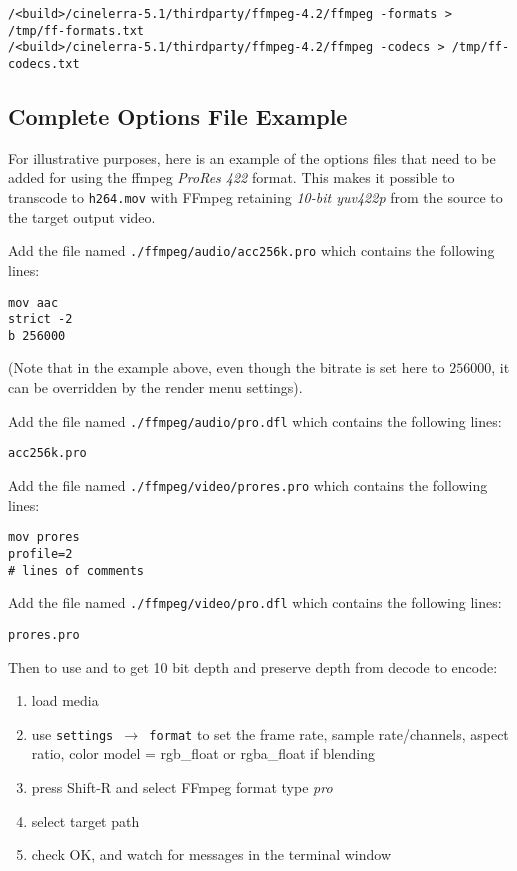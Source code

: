 \begin{lstlisting}[style=sh]
/<build>/cinelerra-5.1/thirdparty/ffmpeg-4.2/ffmpeg -formats > /tmp/ff-formats.txt
/<build>/cinelerra-5.1/thirdparty/ffmpeg-4.2/ffmpeg -codecs > /tmp/ff-codecs.txt
\end{lstlisting}

\subsection{Complete Options File Example}%
\label{sub:complete_options_file_example}

For illustrative purposes, here is an example of the options files that need to be added for using the ffmpeg \textit{ProRes 422} format. This makes it possible to transcode to \texttt{h264.mov} with FFmpeg retaining \textit{10-bit yuv422p} from the source to the target output video.

Add the file named  \texttt{./ffmpeg/audio/acc256k.pro} which contains the following lines:

\begin{lstlisting}[style=sh]
mov aac
strict -2
b 256000
\end{lstlisting}

(Note that in the example above, even though the bitrate is set here to $256000$, it can be 	overridden by the render menu settings).

Add the file named \texttt{./ffmpeg/audio/pro.dfl} which contains the following lines:

\begin{lstlisting}[style=sh]
acc256k.pro
\end{lstlisting}

Add the file named \texttt{./ffmpeg/video/prores.pro} which contains the following lines:

\begin{lstlisting}[style=sh]
mov prores
profile=2
# lines of comments
\end{lstlisting}

Add the file named \texttt{./ffmpeg/video/pro.dfl} which contains the following lines:

\begin{lstlisting}[style=sh]
prores.pro
\end{lstlisting}

Then to use and to get 10 bit depth and preserve depth from decode to encode:

\begin{enumerate}
    \item load media
    \item use \texttt{settings $\rightarrow$ format} to set the frame rate, sample rate/channels, aspect ratio, 
    color model = rgb\_float or rgba\_float if blending
    \item press Shift-R and select FFmpeg format type \textit{pro}
    \item select target path
    \item check OK, and watch for messages in the terminal window
\end{enumerate}

